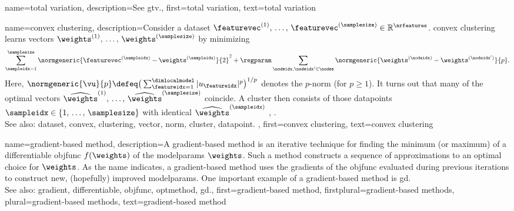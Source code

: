 {name={total variation}, 
	description={See \gls{gtv}.},
	first={total variation},
	text={total variation} 
}


 {name={convex clustering}, 
 	description={Consider a \gls{dataset} 
 		$\featurevec^{(1)}, \,\ldots, \,\featurevec^{(\samplesize)} \in \mathbb{R}^{\nrfeatures}$. 
 		\Gls{convex} \gls{clustering} learns \glspl{vector} $\weights^{(1)}, \,\ldots, \,\weights^{(\samplesize)}$ by minimizing 
 		$$\sum_{\sampleidx=1}^{\samplesize} \normgeneric{\featurevec^{(\sampleidx)} - \weights^{(\sampleidx)}}{2}^2 + 
 		\regparam \sum_{\nodeidx,\nodeidx' \in \nodes} \normgeneric{\weights^{(\nodeidx)} - \weights^{(\nodeidx')}}{p}.$$ 
		Here, $\normgeneric{\vu}{p} \defeq \big( \sum_{\featureidx=1}^{\dimlocalmodel} |u_{\featureidx}|^{p} \big)^{1/p}$ 
		denotes the $p$-\gls{norm} (for $p\geq1$).  
		It turns out that many of the optimal \glspl{vector} $\widehat{\weights}^{(1)}, \,\ldots, \,\widehat{\weights}^{(\samplesize)}$ 
		coincide. A \gls{cluster} then consists of those \glspl{datapoint} $\sampleidx \in \{1, \,\ldots, \,\samplesize\}$ 
		with identical $\widehat{\weights}^{(\sampleidx)}$ \cite{JMLR:v22:18-694}, \cite{Pelckmans2005}. 
			\\
		See also: \gls{dataset}, \gls{convex}, \gls{clustering}, \gls{vector}, \gls{norm}, \gls{cluster}, \gls{datapoint}. },
 	first={convex clustering},
	text={convex clustering} 
}


{name={gradient-based method}, 
	description={A \Gls{gradient}-based 
		method is an iterative technique for finding the \gls{minimum} (or \gls{maximum}) 
		of a \gls{differentiable} \gls{objfunc} $f(\weights)$ of the \glspl{modelparam} $\weights$. 
		Such a method constructs a sequence of approximations to an optimal choice for $\weights$. 
		As the name indicates, a \gls{gradient}-based method uses the \glspl{gradient} 
		of the \gls{objfunc} evaluated during previous iterations to construct new, 
		(hopefully) improved \glspl{modelparam}. One important example of a \gls{gradient}-based 
		method is \gls{gd}.
				\\
		See also: \gls{gradient}, \gls{differentiable}, \gls{objfunc}, \gls{optmethod}, \gls{gd}.},
	first={gradient-based method},
	firstplural={gradient-based methods},
	plural={gradient-based methods},
	text={gradient-based method} 
}


